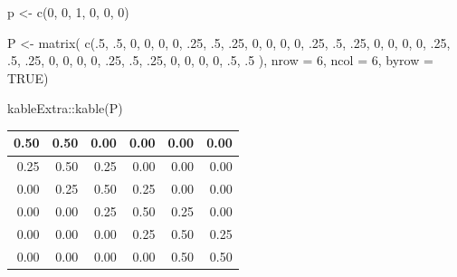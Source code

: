 \documentclass[
  10pt,
  italian,
  a4paper,
  extrafontsizes,onecolumn,openright
  ]{memoir}
\newenvironment{Shaded}{\begin{snugshade}}{\end{snugshade}}
\newcommand{\AttributeTok}[1]{\textcolor[rgb]{0.77,0.63,0.00}{#1}}
\newcommand{\ConstantTok}[1]{\textcolor[rgb]{0.00,0.00,0.00}{#1}}
\newcommand{\DecValTok}[1]{\textcolor[rgb]{0.00,0.00,0.81}{#1}}
\newcommand{\FunctionTok}[1]{\textcolor[rgb]{0.00,0.00,0.00}{#1}}
\newcommand{\NormalTok}[1]{#1}
\newcommand{\OtherTok}[1]{\textcolor[rgb]{0.56,0.35,0.01}{#1}}
\newcommand{\SpecialCharTok}[1]{\textcolor[rgb]{0.00,0.00,0.00}{#1}}
\begin{document}
\begin{Shaded}
\begin{Highlighting}[]
\NormalTok{p }\OtherTok{\textless{}{-}} \FunctionTok{c}\NormalTok{(}\DecValTok{0}\NormalTok{, }\DecValTok{0}\NormalTok{, }\DecValTok{1}\NormalTok{, }\DecValTok{0}\NormalTok{, }\DecValTok{0}\NormalTok{, }\DecValTok{0}\NormalTok{)}

\NormalTok{P }\OtherTok{\textless{}{-}} \FunctionTok{matrix}\NormalTok{(}
  \FunctionTok{c}\NormalTok{(.}\DecValTok{5}\NormalTok{, .}\DecValTok{5}\NormalTok{, }\DecValTok{0}\NormalTok{, }\DecValTok{0}\NormalTok{, }\DecValTok{0}\NormalTok{, }\DecValTok{0}\NormalTok{,}
\NormalTok{    .}\DecValTok{25}\NormalTok{, .}\DecValTok{5}\NormalTok{, .}\DecValTok{25}\NormalTok{, }\DecValTok{0}\NormalTok{, }\DecValTok{0}\NormalTok{, }\DecValTok{0}\NormalTok{,}
    \DecValTok{0}\NormalTok{, .}\DecValTok{25}\NormalTok{, .}\DecValTok{5}\NormalTok{, .}\DecValTok{25}\NormalTok{, }\DecValTok{0}\NormalTok{, }\DecValTok{0}\NormalTok{,}
    \DecValTok{0}\NormalTok{, }\DecValTok{0}\NormalTok{, .}\DecValTok{25}\NormalTok{, .}\DecValTok{5}\NormalTok{, .}\DecValTok{25}\NormalTok{, }\DecValTok{0}\NormalTok{,}
    \DecValTok{0}\NormalTok{, }\DecValTok{0}\NormalTok{, }\DecValTok{0}\NormalTok{, .}\DecValTok{25}\NormalTok{, .}\DecValTok{5}\NormalTok{, .}\DecValTok{25}\NormalTok{,}
    \DecValTok{0}\NormalTok{, }\DecValTok{0}\NormalTok{, }\DecValTok{0}\NormalTok{, }\DecValTok{0}\NormalTok{, .}\DecValTok{5}\NormalTok{, .}\DecValTok{5}
\NormalTok{    ),}
  \AttributeTok{nrow =} \DecValTok{6}\NormalTok{, }\AttributeTok{ncol =} \DecValTok{6}\NormalTok{, }\AttributeTok{byrow =} \ConstantTok{TRUE}\NormalTok{)}

\NormalTok{kableExtra}\SpecialCharTok{::}\FunctionTok{kable}\NormalTok{(P)}
\end{Highlighting}
\end{Shaded}

\begin{tabular}{r|r|r|r|r|r}
\hline
0.50 & 0.50 & 0.00 & 0.00 & 0.00 & 0.00\\
\hline
0.25 & 0.50 & 0.25 & 0.00 & 0.00 & 0.00\\
\hline
0.00 & 0.25 & 0.50 & 0.25 & 0.00 & 0.00\\
\hline
0.00 & 0.00 & 0.25 & 0.50 & 0.25 & 0.00\\
\hline
0.00 & 0.00 & 0.00 & 0.25 & 0.50 & 0.25\\
\hline
0.00 & 0.00 & 0.00 & 0.00 & 0.50 & 0.50\\
\hline
\end{tabular}
\end{document}
